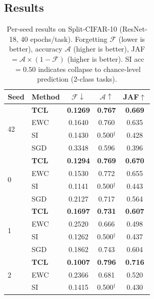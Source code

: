 \subsection{Results}
\label{sec:results}

\begin{table}[h]
\centering
\caption{Per-seed results on Split-CIFAR-10 (ResNet-18, 40 epochs/task).
Forgetting $\mathcal{F}$ (lower is better), accuracy $\mathcal{A}$ (higher is better),
JAF $= \mathcal{A}\times(1-\mathcal{F})$ (higher is better).
SI acc$=0.50$ indicates collapse to chance-level prediction (2-class tasks).}
\label{tab:main_results}
\begin{tabular}{llccc}
\toprule
Seed & Method & $\mathcal{F}\downarrow$ & $\mathcal{A}\uparrow$ & JAF$\uparrow$ \\
\midrule
\multirow{4}{*}{42}
 & \textbf{TCL} & \textbf{0.1269} & \textbf{0.767} & \textbf{0.669} \\
 & EWC          & 0.1640          & 0.760          & 0.635          \\
 & SI           & 0.1430          & 0.500$^\dagger$& 0.428          \\
 & SGD          & 0.3348          & 0.596          & 0.396          \\
\midrule
\multirow{4}{*}{0}
 & \textbf{TCL} & \textbf{0.1294} & \textbf{0.769} & \textbf{0.670} \\
 & EWC          & 0.1530          & 0.772          & 0.655          \\
 & SI           & 0.1141          & 0.500$^\dagger$& 0.443          \\
 & SGD          & 0.2127          & 0.717          & 0.564          \\
\midrule
\multirow{4}{*}{1}
 & \textbf{TCL} & \textbf{0.1697} & \textbf{0.731} & \textbf{0.607} \\
 & EWC          & 0.2520          & 0.666          & 0.498          \\
 & SI           & 0.1262          & 0.500$^\dagger$& 0.437          \\
 & SGD          & 0.1862          & 0.743          & 0.604          \\
\midrule
\multirow{4}{*}{2}
 & \textbf{TCL} & \textbf{0.1007} & \textbf{0.796} & \textbf{0.716} \\
 & EWC          & 0.2366          & 0.681          & 0.520          \\
 & SI           & 0.1415          & 0.500$^\dagger$& 0.430          \\

\end{tabular}
\end{table}
